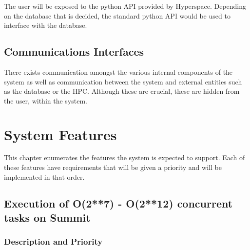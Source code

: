 \documentclass{scrreprt}
\begin{document}
The user will be exposed to the python API provided by Hyperspace. Depending on the database that is decided, the standard python API would be used to interface with the database. 

\section{Communications Interfaces}

There exists communication amongst the various internal components of the system as well as communication between the system and external entities such as the database or the HPC. Although these are crucial, these are hidden from the user, within the system.


\chapter{System Features}

This chapter enumerates the features the system is expected to support. Each of these features have requirements that will be given a priority and will be implemented in that order. 

\section{Execution of O(2**7) - O(2**12) concurrent tasks on Summit}


\subsection{Description and Priority}
\end{document}
